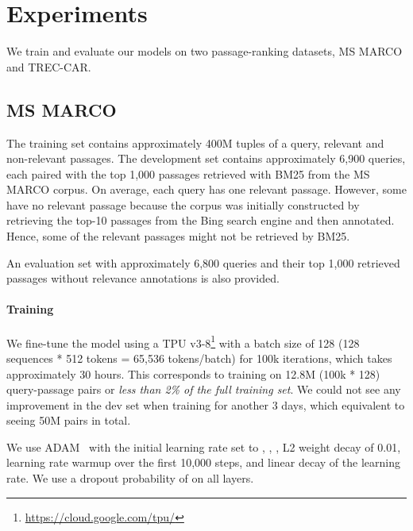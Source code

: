 \documentclass{article} \usepackage{iclr2019_conference}
\begin{document}
\section{Experiments}

We train and evaluate our models on two passage-ranking datasets, MS MARCO and TREC-CAR.

\subsection{MS MARCO}

The training set contains approximately 400M tuples of a query, relevant and non-relevant passages. The development set contains approximately 6,900 queries, each paired with the top 1,000 passages retrieved with BM25 from the MS MARCO corpus. On average, each query has one relevant passage. However, some have no relevant passage because the corpus was initially constructed by retrieving the top-10 passages from the Bing search engine and then annotated. Hence, some of the relevant passages might not be retrieved by BM25.

An evaluation set with approximately 6,800 queries and their top 1,000 retrieved passages without relevance annotations is also provided.

\paragraph{Training}

We fine-tune the model using a TPU v3-8\footnote{
\url{https://cloud.google.com/tpu/}
} 
with a batch size of 128 (128 sequences * 512 tokens = 65,536 tokens/batch) for 100k iterations, which takes approximately 30 hours. This corresponds to training on 12.8M (100k * 128) query-passage pairs or \textit{less than 2\% of the full training set}. We could not see any improvement in the dev set when training for another 3 days, which equivalent to seeing 50M pairs in total.

We use ADAM~\citep{kingma2014adam} with the initial learning rate set to , , , L2 weight decay of 0.01, learning rate warmup over the first 10,000 steps, and linear decay of the learning rate. We use a dropout probability of  on all layers.
\end{document}
